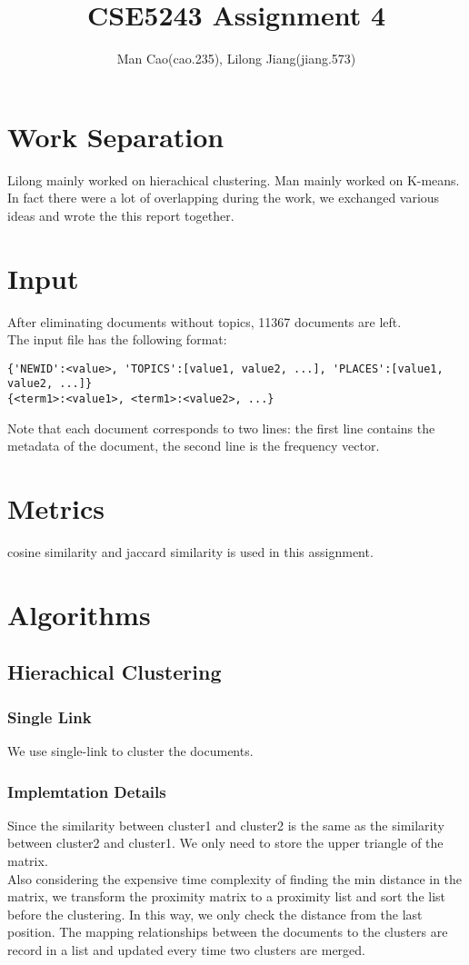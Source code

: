 \documentclass{article}
\begin{document}
\title{CSE5243 Assignment 4}
\author{Man Cao(cao.235), Lilong Jiang(jiang.573)}
\maketitle

\section{Work Separation}
Lilong mainly worked on hierachical clustering. Man mainly worked on
K-means. In fact there were a lot of overlapping during the
work, we exchanged various ideas and wrote the this report together.
\section{Input}
After eliminating documents without topics, 11367 documents are left.\\
The input file has the following format:
\begin{verbatim}
{'NEWID':<value>, 'TOPICS':[value1, value2, ...], 'PLACES':[value1, value2, ...]}
{<term1>:<value1>, <term1>:<value2>, ...}
\end{verbatim}
Note that each document corresponds to two lines: the first line contains the
metadata of the document, the second line is the frequency vector.

\section{Metrics}
cosine similarity and jaccard similarity is used in this assignment.

\section{Algorithms}
\subsection{Hierachical Clustering}
\subsubsection{Single Link}
We use single-link to cluster the documents.
\subsubsection{Implemtation Details}
Since the similarity between cluster1 and cluster2 is the same as the similarity between cluster2 and cluster1. We only need to store the upper triangle of the matrix.\\
Also considering the expensive time complexity of finding the min distance in the matrix, we transform the proximity matrix to a proximity list and sort the list before the clustering. In this way, we only check the distance from the last position. The mapping relationships between the documents to the clusters are record in a list and updated every time two clusters are merged.  
\end{document}
